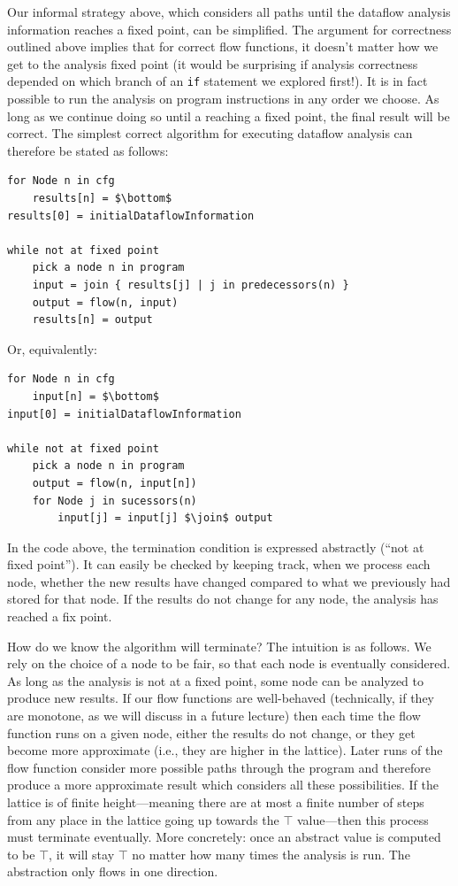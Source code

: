 \documentclass[11pt]{article}
\begin{document}
Our informal strategy above, which considers all paths until the dataflow
analysis information reaches a fixed point, can be simplified.  The argument for
correctness outlined above implies that for correct flow functions, it doesn't
matter how we get to the analysis fixed point (it would be
surprising if analysis correctness depended on which branch of an \texttt{if} statement
we explored first!).  It is in fact possible to run the analysis on program
instructions in any order we choose.  As long as we continue doing so until a
reaching a fixed point, the final result will be correct.  The simplest
correct algorithm for executing dataflow analysis can therefore be stated as
follows:

\begin{lstlisting}[mathescape]
for Node n in cfg
    results[n] = $\bottom$
results[0] = initialDataflowInformation

while not at fixed point
    pick a node n in program
	input = join { results[j] | j in predecessors(n) }
	output = flow(n, input)
	results[n] = output
\end{lstlisting}

Or, equivalently:

\begin{lstlisting}[mathescape]
for Node n in cfg
    input[n] = $\bottom$
input[0] = initialDataflowInformation

while not at fixed point
    pick a node n in program
    output = flow(n, input[n])
    for Node j in sucessors(n)
        input[j] = input[j] $\join$ output
\end{lstlisting}

In the code above, the termination condition is expressed abstractly (``not at
fixed point'').  It can easily be checked by keeping track, when we process each
node, whether the new results have changed compared to what we previously
had stored for that node.  If the results do not change for any node, the
analysis has reached a fix point. 

How do we know the algorithm will terminate?  The intuition is as follows.  We
rely on the choice of a node to be fair, so that each node is
eventually considered.  As long as the analysis is not at a fixed point, some
node can be analyzed to produce new results.  If our flow
functions are well-behaved (technically, if they are monotone, as we will
discuss in a future lecture) then each time the flow function runs on a given
node, either the results do not change, or they get become more approximate
(i.e., they are higher in the lattice).  Later runs of the flow function consider
more possible paths through the program and therefore produce a more approximate
result which considers all these possibilities.  If the lattice is of finite
height---meaning there are at most a finite number of steps from any place in
the lattice going up towards the $\top$ value---then this process must terminate
eventually.  More concretely: once an abstract value is computed to be $\top$,
it will stay $\top$ no matter how many times the analysis is run.  The
abstraction only flows in one direction.
\end{document}
